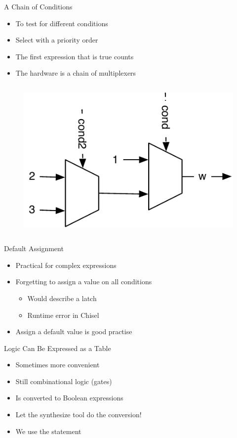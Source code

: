 \begin{frame}[fragile]{A Chain of Conditions}
\begin{itemize}
\item To test for different conditions
\item Select with a priority order
\item The first expression that is true counts
\item The hardware is a chain of multiplexers
\end{itemize}
\begin{columns}
\begin{figure}
  \includegraphics[scale=\scale]{../figures/mux-chain}
\end{figure}
\end{columns}
\end{frame}

\begin{frame}[fragile]{Default Assignment}
\begin{itemize}
\item Practical for complex expressions
\item Forgetting to assign a value on all conditions
\begin{itemize}
\item Would describe a latch
\item Runtime error in Chisel
\end{itemize}
\item Assign a default value is good practise
\end{itemize}
\end{frame}

\begin{frame}[fragile]{Logic Can Be Expressed as a Table}
\begin{itemize}
\item Sometimes more convenient 
\item Still combinational logic (gates)
\item Is converted to Boolean expressions
\item Let the synthesize tool do the conversion!
\item We use the  statement
\end{itemize}
\end{frame}


